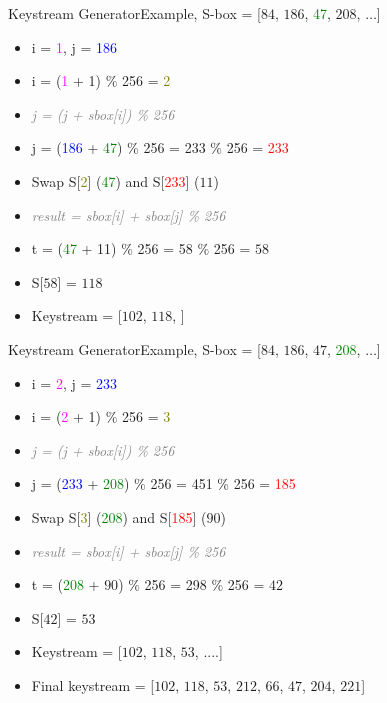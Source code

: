 \documentclass[
	aspectratio=169,	%
	onlytextwidth,		%
	t					%
	]{beamer}
\begin{document}
\begin{frame}[fragile]{Keystream Generator}{Example, S-box = [$84$, $186$, \textcolor{green}{47}, $208$, $\dots$]}
	\begin{itemize}
		\item i = \textcolor{magenta}{1}, j = \textcolor{blue}{186}
		\item i = (\textcolor{magenta}{1} + 1) $\%$ 256 = \textcolor{olive}{2}
		\item \textit{\textcolor{gray}{j = (j + sbox[i]) \% 256}}
		\item j = (\textcolor{blue}{186} + \textcolor{green}{47}) $\%$ 256 = 233 $\%$ 256 = \textcolor{red}{233}
	\end{itemize}
	\medskip
	\begin{itemize}
		\item Swap S[{\textcolor{olive}{2}}] (\textcolor{green}{47}) and S[\textcolor{red}{233}] ($11$)
		\item \textit{\textcolor{gray}{result = sbox[i] + sbox[j] \% 256}}
		\item t = (\textcolor{green}{47} + 11) $\%$ 256 = 58 $\%$ 256 = $58$
		\item S[$58$] = $118$
		\item Keystream = [$102$, $118$, ]
	\end{itemize}
\end{frame}

\begin{frame}[fragile]{Keystream Generator}{Example, S-box = [$84$, $186$, $47$, \textcolor{green}{208}, $\dots$]}
	\begin{itemize}
		\item i = \textcolor{magenta}{2}, j = \textcolor{blue}{233}
		\item i = (\textcolor{magenta}{2} + 1) $\%$ 256 = \textcolor{olive}{3}
		\item \textit{\textcolor{gray}{j = (j + sbox[i]) \% 256}}
		\item j = (\textcolor{blue}{233} + \textcolor{green}{208}) $\%$ 256 = 451 $\%$ 256 = \textcolor{red}{185}
	\end{itemize}
	\medskip
	\begin{itemize}
		\item Swap S[\textcolor{olive}{3}] (\textcolor{green}{208}) and S[\textcolor{red}{185}] ($90$)
		\item \textit{\textcolor{gray}{result = sbox[i] + sbox[j] \% 256}}
		\item t = (\textcolor{green}{208} + $90$) $\%$ 256 = 298 $\%$ 256 = $42$
		\item S[$42$] = $53$
		\item Keystream = [$102$, $118$, $53$, ....]
		\item Final keystream = [$102$, $118$, $53$, $212$, $66$, $47$, $204$, $221$]
	\end{itemize}
\end{frame}
\end{document}
